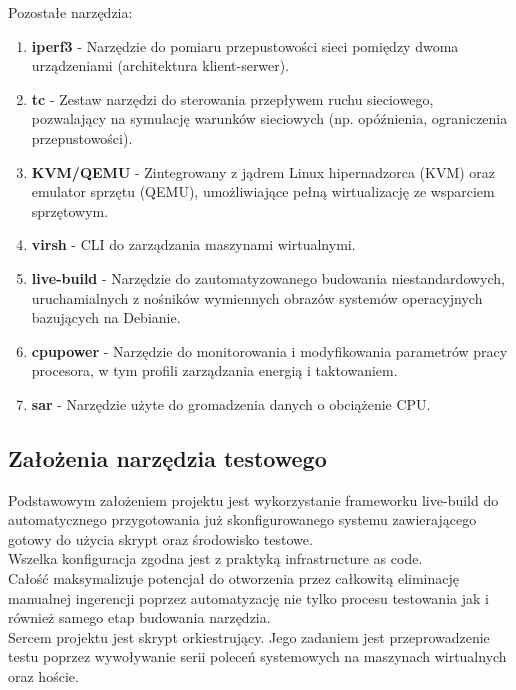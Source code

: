 Pozostałe narzędzia:

\begin{enumerate}[leftmargin=*]
    \item \textbf{iperf3} - Narzędzie do pomiaru przepustowości sieci pomiędzy dwoma urządzeniami (architektura klient-serwer).
    \item \textbf{tc} - Zestaw narzędzi do sterowania przepływem ruchu sieciowego, pozwalający na symulację warunków sieciowych (np. opóźnienia, ograniczenia przepustowości).
    \item \textbf{KVM/QEMU} - Zintegrowany z jądrem Linux hipernadzorca (KVM) oraz emulator sprzętu (QEMU), umożliwiające pełną wirtualizację ze wsparciem sprzętowym.
    \item \textbf{virsh} - CLI do zarządzania maszynami wirtualnymi.
    \item \textbf{live-build} - Narzędzie do zautomatyzowanego budowania niestandardowych, uruchamialnych z nośników wymiennych obrazów systemów operacyjnych bazujących na Debianie.
    \item \textbf{cpupower} - Narzędzie do monitorowania i modyfikowania parametrów pracy procesora, w tym profili zarządzania energią i taktowaniem.
    \item \textbf{sar} - Narzędzie użyte do gromadzenia danych o obciążenie CPU.
\end{enumerate}

\newpage

\subsection{Założenia narzędzia testowego}

Podstawowym założeniem projektu jest wykorzystanie frameworku live-build do automatycznego przygotowania już skonfigurowanego systemu zawierającego gotowy do użycia skrypt oraz środowisko testowe.\\

Wszelka konfiguracja zgodna jest z praktyką infrastructure as code.\\

Całość maksymalizuje potencjał do otworzenia przez całkowitą eliminację manualnej ingerencji poprzez automatyzację nie tylko procesu testowania jak i również samego etap budowania narzędzia.\\

Sercem projektu jest skrypt orkiestrujący. Jego zadaniem jest przeprowadzenie testu poprzez wywoływanie serii poleceń systemowych na maszynach wirtualnych oraz hoście.


